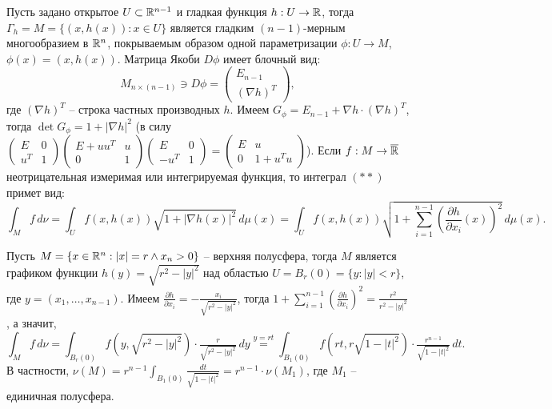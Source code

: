 \begin{example}
	Пусть задано открытое $U \subset \mathbb{R}^{n-1}$ и гладкая функция $h : U \to \mathbb{R}$, тогда $\Gamma_h = M = \{(x, h(x)) : x \in U\}$ является гладким $(n-1)$-мерным многообразием 
	в $\mathbb{R}^n$, покрываемым образом одной параметризации $\phi : U \to M$, $\phi(x) = (x, h(x))$. 
	Матрица Якоби $D \phi$ имеет блочный вид:
	\[ M_{n \times (n-1)} \ni D \phi = \begin{pmatrix}
		E_{n-1} \\ 
		(\nabla h)^T
	\end{pmatrix}, \]
	где $(\nabla h)^T$ -- строка частных производных $h$. 
	Имеем $G_{\phi} = E_{n-1} + \nabla h \cdot (\nabla h)^T$, тогда $\det G_{\phi}= 1 + |\nabla h|^2$ (в силу $
\left(\begin{smallmatrix} E & 0 \\ u^T & 1 \end{smallmatrix}\right)
\left(\begin{smallmatrix} E+uu^T & u \\ 0 & 1 \end{smallmatrix}\right)
\left(\begin{smallmatrix} E & 0 \\ -u^T & 1 \end{smallmatrix}\right)
=
\left(\begin{smallmatrix} E & u \\ 0 & 1+u^Tu \end{smallmatrix}\right)
$). 
	Если $f : M \to \overline{\mathbb{R}}$ неотрицательная измеримая или интегрируемая функция, то интеграл $(**)$ примет вид: 
	\[ \int_M f \, d\nu = \int_U f(x, h(x)) \sqrt{1 + |\nabla h(x)|^2} \, d\mu(x) = \int_U f(x, h(x)) \sqrt{1 + \sum_{i=1}^{n-1} \left(\frac{\partial h}{\partial x_i}(x)\right)^2} \, d\mu(x). \]
\end{example}

\begin{example}
	Пусть $M = \{x \in \mathbb{R}^n : |x| = r \wedge x_n > 0\}$ -- верхняя полусфера, тогда
	$M$ является графиком функции $h(y) = \sqrt{r^2 - |y|^2}$ над областью $U = B_r(0) = \{y : |y| < r\}$, где $y = (x_1, \dotsc, x_{n-1})$.
	Имеем $\frac{\partial h}{\partial x_i} = - \frac{x_i}{\sqrt{r^2 - |y|^2}}$, тогда $1 + \sum \limits_{i=1}^{n-1} \left( \frac{\partial h}{\partial x_i} \right)^2 = \frac{r^2}{r^2 - |y|^2}$, а значит, 
	\[ \int_{M} f \, d \nu = \int_{B_r(0)} f(y, \sqrt{r^2 - |y|^2}) \cdot \tfrac{r}{\sqrt{r^2 - |y|^2}} \, dy \overset{y = rt}{=} \int_{B_1(0)} f(rt, r \sqrt{1 - |t|^2}) \cdot \tfrac{r^{n-1}}{\sqrt{1 - |t|^2}} \, dt. \]
	В частности, $\nu(M) =  r^{n-1} \int_{B_1(0)} \frac{dt}{\sqrt{1 - |t|^2}} = r^{n-1} \cdot \nu(M_1)$, где $M_1$ -- единичная полусфера.
\end{example}


